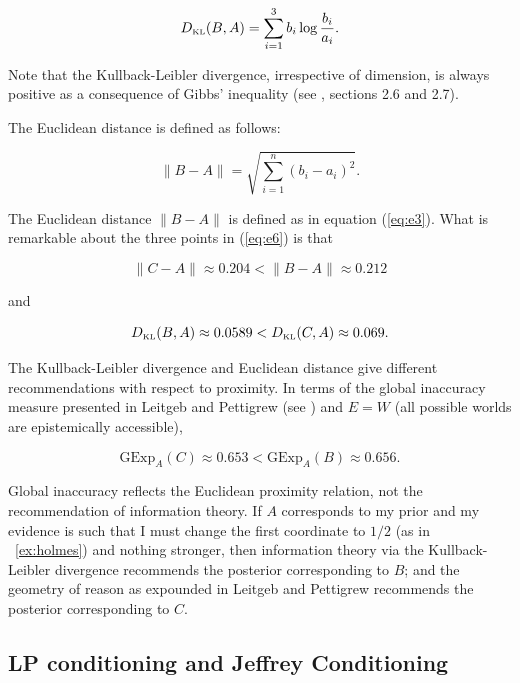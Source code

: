 \documentclass[12pt]{article}
\begin{document}
\begin{equation}
  \label{eq:e7}
  D_{\mbox{\tiny KL}}(B,A)=\sum_{i=1}^{3}b_{i}\log\frac{b_{i}}{a_{i}}.
\end{equation}

Note that the Kullback-Leibler divergence, irrespective of dimension,
is always positive as a consequence of Gibbs' inequality (see
, sections 2.6 and 2.7).

The Euclidean distance is defined as follows:

\begin{equation}
  \label{eq:e3}
  \|B-A\|=\sqrt{\sum_{i=1}^{n}\left(b_{i}-a_{i}\right)^{2}}.
\end{equation}

The Euclidean distance $\|B-A\|$ is defined as in equation
(\ref{eq:e3}). What is remarkable about the three points in
(\ref{eq:e6}) is that

\begin{equation}
  \label{eq:e8}
  \|C-A\|\approx{}0.204<\|B-A\|\approx{}0.212
\end{equation}

and

\begin{equation}
  \label{eq:e9}
  D_{\mbox{\tiny KL}}(B,A)\approx{}0.0589<D_{\mbox{\tiny KL}}(C,A)\approx{}0.069.
\end{equation}

The Kullback-Leibler divergence and Euclidean distance give different
re\-commendations with respect to proximity. In terms of the global
inaccuracy measure presented in Leitgeb and Pettigrew (see
) and $E=W$ (all possible worlds
are epistemically accessible),

\begin{equation}
  \label{eq:e8a}
  \mbox{GExp}_{A}(C)\approx{}0.653<\mbox{GExp}_{A}(B)\approx{}0.656.
\end{equation}

Global inaccuracy reflects the Euclidean proximity relation, not the
re\-commendation of information theory. If $A$ corresponds to my prior
and my evidence is such that I must change the first coordinate to
$1/2$ (as in {\xample}~\ref{ex:holmes}) and nothing stronger, then
information theory via the Kullback-Leibler divergence re\-commends
the posterior corresponding to $B$; and the geometry of reason as
expounded in Leitgeb and Pettigrew recommends the posterior
corresponding to $C$. 

\subsection{LP conditioning and Jeffrey Conditioning}
\label{subsec:meexughi}
\end{document}
